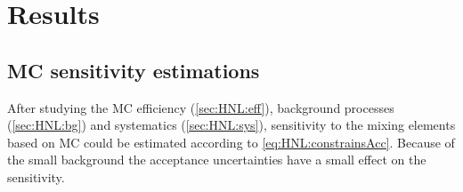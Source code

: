 \documentclass[../main.tex]{subfiles}
\begin{document}
\section{Results}
\subsection{MC sensitivity estimations}
\label{sec:HNL:MCres}

After studying the MC efficiency (\autoref{sec:HNL:eff}), background processes (\autoref{sec:HNL:bg}) and systematics (\autoref{sec:HNL:sys}),  sensitivity to the mixing elements based on MC could be estimated according to \autoref{eq:HNL:constrainsAcc}. Because of the small background the acceptance uncertainties have a small effect on the sensitivity.

\begin{comment}
\begin{figure}[!ht]
    \begin{center}
  \begin{minipage}{0.49\linewidth}
    \centering{\texttt{[image: Ue2fullMC]}  \\  $K^+\to e(e\pi)$}
  \end{minipage}
  \hfill
  \begin{minipage}{0.49\linewidth}
    \centering{\texttt{[image: Umu2fullMC]}  \\  $K^+\to \mu(\mu\pi)$}
  \end{minipage}
  \caption{Sensitivity to mixing elements $\left|Ue\right|^2, \left|U\mu\right|^2$ based on MC samples analysis}
  \label{fig:HNL:LimitsMC1}
    \end{center}
\end{figure}

\begin{figure}[!ht]
    \begin{center}
  \begin{minipage}{0.49\linewidth}
    \centering{\texttt{[image: UeUmufullMC]}  \\  $K^+\to \mu(e\pi)$ and $K^+\to e(\mu\pi)$}
  \end{minipage}
  \begin{minipage}{0.49\linewidth}
    \centering{\texttt{[image: UeMixfullMC]}  \\  $K^+\to e(\mu\mu\nu)$}
  \end{minipage}
  \caption{Sensitivity to mixing elements $\left|UeU\mu\right|$ and $\left|U_{e}\right|\sqrt{\left|U_{e}\right|^2+\left|U_{\tau}\right|^2}$ based on MC samples analysis.}
  \label{fig:HNL:LimitsMC2}
  \end{center}
\end{figure}

As one can see the improvements of PS191 limits can be obtained with the current statistics.

\section{Data unblinding}
\end{comment}
\end{document}
